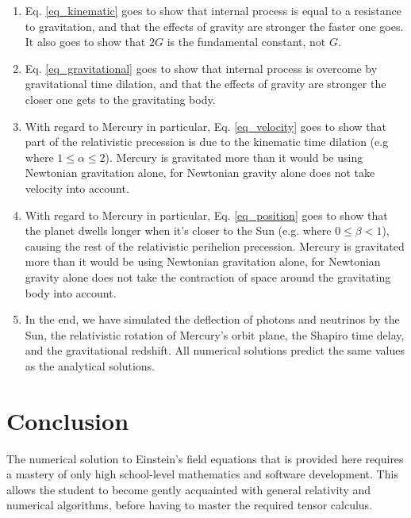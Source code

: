 \documentclass[12pt]{article}
\begin{document}
\begin{enumerate}
\item
Eq. \ref{eq_kinematic} goes to show that internal process is equal to a resistance to gravitation, and that the effects of gravity are stronger the faster one goes.
It also goes to show that $2G$ is the fundamental constant, not $G$.

\item
Eq. \ref{eq_gravitational} goes to show that internal process is overcome by gravitational time dilation, and that the effects of gravity are stronger the closer one gets to the gravitating body.

\item
With regard to Mercury in particular, Eq. \ref{eq_velocity} goes to show that part of the relativistic precession is due to the kinematic time dilation (e.g where $1 \leq \alpha \leq 2$). 
Mercury is gravitated more than it would be using Newtonian gravitation alone, for Newtonian gravity alone does not take velocity into account.

\item
With regard to Mercury in particular, Eq. \ref{eq_position} goes to show that the planet dwells longer when it's closer to the Sun (e.g. where $0 \leq \beta < 1$), causing the rest of the relativistic perihelion precession. 
Mercury is gravitated more than it would be using Newtonian gravitation alone, for Newtonian gravity alone does not take the contraction of space around the gravitating body into account.

\item
In the end, we have simulated the deflection of photons and neutrinos by the Sun, the relativistic rotation of Mercury's orbit plane, the Shapiro time delay, and the gravitational redshift.
All numerical solutions predict the same values as the analytical solutions.

\end{enumerate}







\section{Conclusion}

The numerical solution to Einstein's field equations that is provided here requires a mastery of only high school-level mathematics and software development.
This allows the student to become gently acquainted with general relativity and numerical algorithms, before having to master the required tensor calculus.
\end{document}
